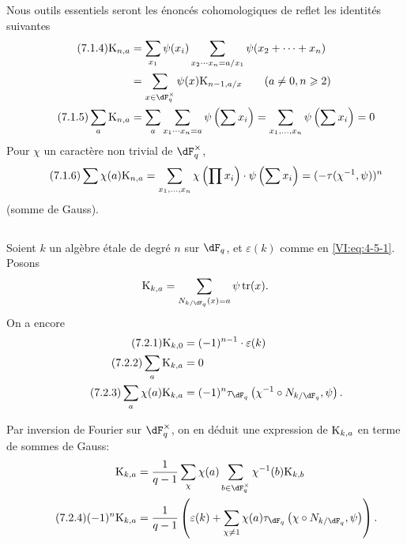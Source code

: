 Nous outils essentiels seront les énoncés cohomologiques de reflet les 
identités suivantes 
\begin{align*}\tag{7.1.4}\label{VI:eq:7-1-4}
  \kloos_{n,a} &= \sum_{x_1} \psi(x_i) \sum_{x_2\dotsm x_n = a/x_1} \psi(x_2+\cdots + x_n) \\ \notag
    &= \sum_{x\in \dF_q^\times} \psi(x) \kloos_{n-1,a/x} \qquad (a\ne 0,n\geqslant 2) \\ \tag{7.1.5}\label{VI:eq:7-1-5}
  \sum_a \kloos_{n,a} &= \sum_a \sum_{x_1 \dotsm x_n = a} \psi\left(\sum x_i\right) = \sum_{x_1,\dots,x_n} \psi\left(\sum x_i\right) = 0 
\end{align*}
Pour $\chi$ un caractère non trivial de $\dF_q^\times$, 
\begin{equation*}\tag{7.1.6}\label{VI:eq:7-1-6}
  \sum \chi(a) \textnormal{K}_{n,a} = \sum_{x_1,\dots,x_n} \chi\left(\prod x_i\right) \cdot \psi\left(\sum x_i\right) = (-\tau(\chi^{-1},\psi))^n 
\end{equation*}
(somme de Gauss). 





\subsection{}\label{VI:7-2}

Soient $k$ un algèbre étale de degré $n$ sur $\dF_q$, et $\varepsilon(k)$ 
comme en \eqref{VI:eq:4-5-1}. Posons 
\[
  \kloos_{k,a} = \sum_{N_{k/\dF_q}(x)=a} \psi \tr(x) \text{.} 
\]
On a encore 
\begin{align*}\tag{7.2.1}\label{VI:eq:7-2-1}
  \kloos_{k,0} &= (-1)^{n-1} \cdot \varepsilon(k) \\ \tag{7.2.2}\label{VI:eq:7-2-2}
  \sum_a \kloos_{k,a} &= 0 \\ \tag{7.2.3}\label{VI:eq:7-2-3}
  \sum_a \chi(a) \kloos_{k,a} &= (-1)^n \tau_{\dF_q}\left(\chi^{-1}\circ N_{k/\dF_q},\psi\right) \text{.} 
\end{align*}

Par inversion de Fourier sur $\dF_q^\times$, on en déduit une expression de 
$\textnormal{K}_{k,a}$ en terme de sommes de Gauss: 
\begin{align*} 
  \kloos_{k,a} &= \frac{1}{q-1} \sum_\chi \chi(a) \sum_{b\in \dF_q^\times} \chi^{-1}(b) \kloos_{k,b} \\ \tag{7.2.4}\label{VI:eq:7-2-4}
  (-1)^n \kloos_{k,a} &= \frac{1}{q-1} \left(\varepsilon(k) + \sum_{\chi\ne 1} \chi(a) \tau_{\dF_q}\left(\chi\circ N_{k/\dF_q},\psi\right) \right) \text{.} 
\end{align*}

